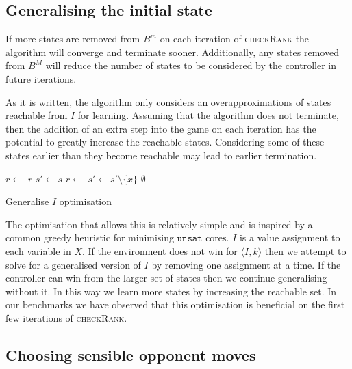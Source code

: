 \documentclass{llncs}
\begin{document}
\subsection{Generalising the initial state}

If more states are removed from $B^m$ on each iteration of \textsc{checkRank}
the algorithm will converge and terminate sooner. Additionally, any states
removed from $B^M$ will reduce the number of states to be considered by the
controller in future iterations.

As it is written, the algorithm only considers an overapproximations of states
reachable from $I$ for learning. Assuming that the algorithm does not
terminate, then the addition of an extra step into the game on each iteration
has the potential to greatly increase the reachable states. Considering some of
these states earlier than they become reachable may lead to earlier
termination.


\begin{algorithm}
    \begin{algorithmic}
            \State $r \gets $ 
             \Return $r$ \EndIIf
            \State $s' \gets s$
                \State $r \gets$ 
                 $s' \gets s' \setminus \{x\}$ \EndIIf
            \EndFor
            \State \Return $\emptyset$
        \EndFunction
    \end{algorithmic}
    \caption{Generalise $I$ optimisation}
    \label{alg:opt1}
\end{algorithm}

The optimisation that allows this is relatively simple and is inspired by a
common greedy heuristic for minimising $\texttt{unsat}$ cores. $I$ is a value
assignment to each variable in $X$. If the environment does not win for
$\langle I, k \rangle$ then we attempt to solve for a generalised version of
$I$ by removing one assignment at a time. If the controller can win from the
larger set of states then we continue generalising without it. In this way we
learn more states by increasing the reachable set. In our benchmarks we have
observed that this optimisation is beneficial on the first few iterations of
\textsc{checkRank}.

\subsection{Choosing sensible opponent moves}
\end{document}
